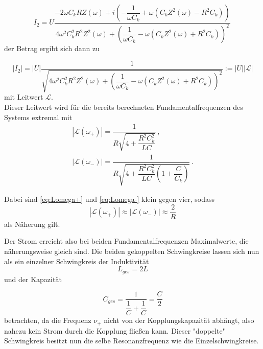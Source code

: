 \begin{equation}
    I_2 = U \dfrac{-2 ω C_k R Z(ω) + i \left(-\dfrac{1}{ωC_k} + ω (C_k Z^2(ω) -  R^2 C_k) \right)}{4 ω^2 C^2_k R^2 Z^2(ω) + \left(\dfrac{1}{ω C_k} - ω (C_k Z^2(ω) +  R^2 C_k) \right)^2}\,
\end{equation} der Betrag ergibt sich dann zu

\begin{equation}
    |I_2| = |U| \dfrac{1}{\sqrt{4 ω^2 C^2_k R^2 Z^2(ω) + \left(\dfrac{1}{ω C_k} - ω (C_k Z^2(ω) +  R^2 C_k) \right)^2}} := |U||\mathcal{L}|
\end{equation} mit Leitwert $\mathcal{L}$.\\

Dieser Leitwert wird für die bereits berechneten Fundamentalfrequenzen des Systems extremal mit
\begin{align}
    |\mathcal{L}(ω_+)| = \dfrac{1}{R \sqrt{4+ \dfrac{R^2 C^2_k}{L C}}} \label{eq:Lomega+}\,, \\
    |\mathcal{L}(ω_-)| = \dfrac{1}{R \sqrt{4+ \dfrac{R^2 C^2_k}{L C} \left(1 + \dfrac{C}{C_k}\right)}} \label{eq:Lomega-}\,.
\end{align}

Dabei sind \eqref{eq:Lomega+} und \eqref{eq:Lomega-} klein gegen vier, sodass
\begin{equation*}
    |\mathcal{L}(ω_+)| \approx |\mathcal{L}(ω_-)| \approx \dfrac{2}{R} 
\end{equation*} als Näherung gilt.

Der Strom erreicht also bei beiden Fundamentalfrequenzen Maximalwerte, die näherungsweise gleich sind. Die beiden gekoppelten Schwingkreise lassen sich nun als ein einzelner Schwingkreis der Induktivität
\begin{equation*}
    L_{ges} = 2 L
\end{equation*} und der Kapazität 

\begin{equation*}
    C_{ges} = \dfrac{1}{\dfrac{1}{C} + \dfrac{1}{C}} = \dfrac{C}{2}
\end{equation*} betrachten, da die Frequenz $ν_+$ nicht von der Kopplungskapazität abhängt, also nahezu kein Strom durch die Kopplung fließen kann.
Dieser "doppelte" Schwingkreis besitzt nun die selbe Resonanzfrequenz wie die Einzelschwingkreise. 

